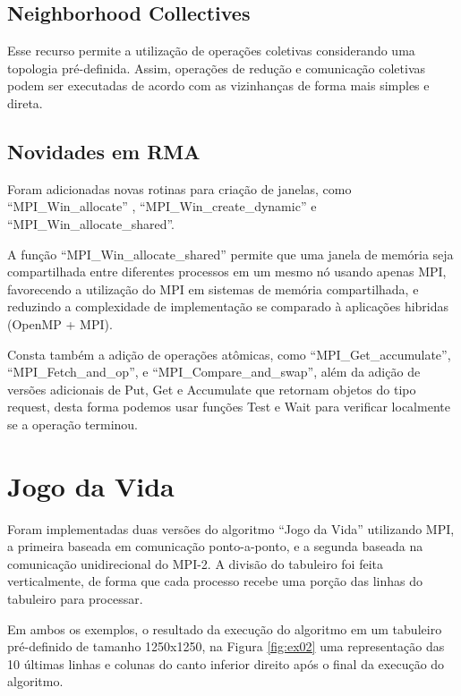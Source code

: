 \documentclass[conference]{IEEEtran}
\begin{document}
\subsection{Neighborhood Collectives}
Esse recurso permite a utilização de operações coletivas considerando uma topologia pré-definida. Assim, operações de redução e comunicação coletivas podem ser executadas de acordo com as vizinhanças de forma mais simples e direta.

\subsection{Novidades em RMA}

Foram adicionadas novas rotinas para criação de janelas, como ``MPI\_Win\_allocate'' , ``MPI\_Win\_create\_dynamic'' e ``MPI\_Win\_allocate\_shared''.

A função ``MPI\_Win\_allocate\_shared'' permite que uma janela de memória seja compartilhada entre diferentes processos em um mesmo nó usando apenas MPI, favorecendo a utilização do MPI em sistemas de memória compartilhada, e reduzindo a complexidade de implementação se comparado à aplicações hibridas (OpenMP + MPI).

Consta também a adição de operações atômicas, como ``MPI\_Get\_accumulate'', ``MPI\_Fetch\_and\_op'', e ``MPI\_Compare\_and\_swap'', além da adição de versões adicionais de Put, Get e Accumulate que retornam objetos do tipo request, desta forma podemos usar funções Test e Wait para verificar localmente se a operação terminou.


\section {Jogo da Vida}

Foram implementadas duas versões do algoritmo ``Jogo da Vida'' utilizando MPI, a primeira baseada em comunicação ponto-a-ponto, e a segunda baseada na comunicação unidirecional do MPI-2. A divisão do tabuleiro foi feita verticalmente, de forma que cada processo recebe uma porção das linhas do tabuleiro para processar.

Em ambos os exemplos, o resultado da execução do algoritmo em um tabuleiro pré-definido de tamanho 1250x1250, na Figura \ref{fig:ex02} uma representação das 10 últimas linhas e colunas do canto inferior direito após o final da execução do algoritmo.
\end{document}
